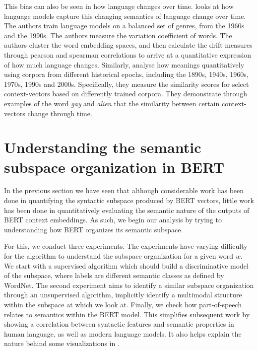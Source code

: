 \documentclass[a4paper,12pt,twoside,openright]{report}
\begin{document}
This bias can also be seen in how language changes over time. \cite{martinc20} looks at how language models capture this  changing semantics of language change over time.
The authors train language models on a balanced set of genres, from the 1960s and the 1990s.
The authors measure the variation coefficient of words.
The authors cluster the word embedding spaces, and then calculate the drift measures through pearson and spearman correlations to arrive at a quantitative expression of how much language changes.
Similarly, \cite{hu19} analyse how meanings quantitatively using corpora from different historical epochs, including the 1890s, 1940s, 1960s, 1970s, 1990s and 2000s. 
Specifically, they measure the similarity scores for select context-vectors based on differently trained corpora.
They demonstrate through examples of the word \textit{gay} and \textit{alien} that the similarity between certain context-vectors change through time.

\chapter{Understanding the semantic subspace organization in BERT}\label{section:Understand_BERT}\label{section:UnderstandingBERT} 

In the previous section we have seen that although considerable work has been done in quantifying the syntactic subspace produced by BERT vectors, little work has been done in quantitatively evaluating the semantic nature of the outputs of BERT context embeddings.
As such, we begin our analysis by trying to understanding how BERT organizes its semantic subspace.

For this, we conduct three experiments.
The experiments have varying difficulty for the algorithm to understand the subspace organization for a given word $w$.
We start with a supervised algorithm which should build a discriminative model of the subspace, where labels are different semantic classes as defined by WordNet.
The second experiment aims to identify a similar subspace organization through an unsupervised algorithm, implicitly identify a multimodal structure within the subspace at which we look at.
Finally, we check how part-of-speech relates to semantics within the BERT model. 
This simplifies subsequent work by showing a correlation between syntactic features and semantic properties in human language, as well as modern language models.
It also helps explain the nature behind some visualizations in \cite{coenen19}.
\end{document}
